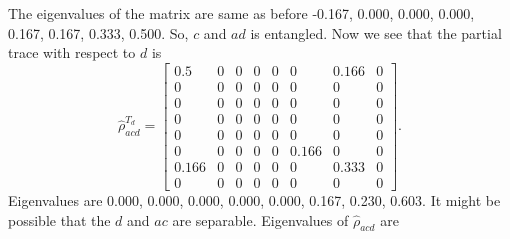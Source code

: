 \documentclass{amsart}
\theoremstyle{plain}
\theoremstyle{definition}
\theoremstyle{plain}
\begin{document}
The eigenvalues of the matrix are same as before -0.167, 0.000, 0.000, 0.000, 0.167, 0.167, 0.333, 0.500. So, $c$ and $ad$ is entangled. Now we see that the partial trace with respect to $d$ is 
\begin{equation*}
	\hat{\rho}_{acd}^{T_d} = \left[\begin{matrix}0.5 & 0 & 0 & 0 & 0 & 0 & 0.166 & 0\\0 & 0 & 0 & 0 & 0 & 0 & 0 & 0\\0 & 0 & 0 & 0 & 0 & 0 & 0 & 0\\0 & 0 & 0 & 0 & 0 & 0 & 0 & 0\\0 & 0 & 0 & 0 & 0 & 0 & 0 & 0\\0 & 0 & 0 & 0 & 0 & 0.166 & 0 & 0\\0.166 & 0 & 0 & 0 & 0 & 0 & 0.333 & 0\\0 & 0 & 0 & 0 & 0 & 0 & 0 & 0\end{matrix}\right].
\end{equation*}
Eigenvalues are	0.000, 0.000, 0.000, 0.000, 0.000, 0.167, 0.230, 0.603. It might be possible that the $d$ and $ac$ are separable. Eigenvalues of $\hat{\rho}_{acd}$ are 
\end{document}

